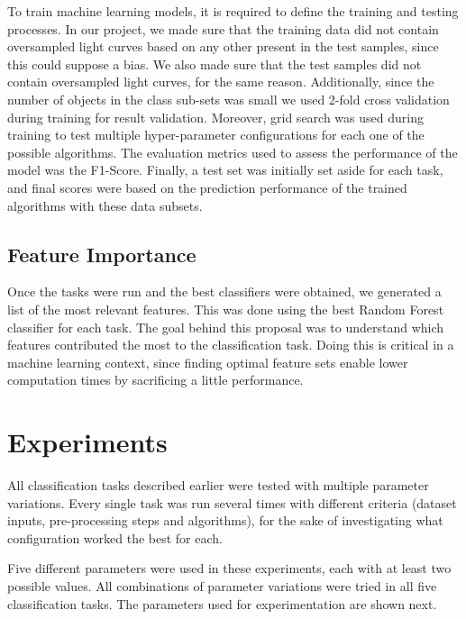 \documentclass[a4paper,fleqn,usenatbib]{mnras}
\begin{document}
To train machine learning models, it is required to define the training and testing processes. In our project, we made sure that the training data did not contain oversampled light curves based on any other present in the test samples, since this could suppose a bias. We also made sure that the test samples did not contain oversampled light curves, for the same reason. Additionally, since the number of objects in the class sub-sets was small we used 2-fold cross validation during training for result validation. Moreover, grid search was used during training to test multiple hyper-parameter configurations for each one of the possible algorithms. The evaluation metrics used to assess the performance of the model was the F1-Score. Finally, a test set was initially set aside for each task, and final scores were based on the prediction performance of the trained algorithms with these data subsets.


\subsection{Feature Importance} \label{subsection_importances}

Once the tasks were run and the best classifiers were obtained, we generated a list of the most relevant features. This was done using the best Random Forest classifier for each task. The goal behind this proposal was to understand which features contributed the most to the classification task. Doing this is critical in a machine learning context, since finding optimal feature sets enable lower computation times by sacrificing a little performance.

\section{Experiments} \label{section_experimentation}
All classification tasks described earlier were tested with multiple parameter variations. Every single task was run several times with different criteria (dataset inputs, pre-processing steps and algorithms), for the sake of investigating what configuration worked the best for each.

Five different parameters were used in these experiments, each with at least two possible values. All combinations of parameter variations were tried in all five classification tasks. The parameters used for experimentation are shown next.
\end{document}
